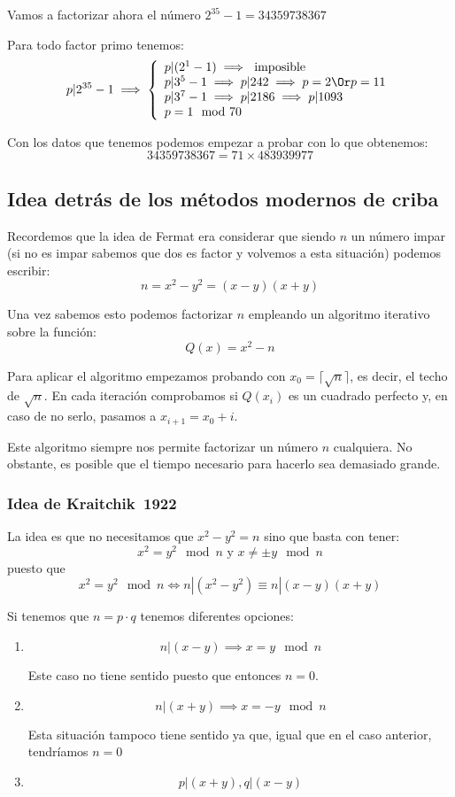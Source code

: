 \begin{example}
Vamos a factorizar ahora el número $2^{35}-1=34359738367$

Para todo factor primo tenemos:
\[p|2^{35}-1 \implies \left\{ \begin{array}{l}p|(2^1-1)\implies \text{ imposible}\\
p|3^5-1 \implies p|242 \implies p=2 \Or p=11\\
p|3^7-1 \implies p |2186 \implies  p|1093\\
p =1 \mod 70 \end{array}\right.\]

Con los datos que tenemos podemos empezar a probar con lo que obtenemos:
\[34359738367 = 71 \times 483939977\]
\end{example}

\subsection{Idea detrás de los métodos modernos de criba}

Recordemos que la idea de Fermat era considerar que siendo $n$ un número impar (si no es impar sabemos que dos es factor y volvemos a esta situación) podemos escribir:
\[n = x^2-y^2 = (x-y)(x+y)\]

Una vez sabemos esto podemos factorizar $n$ empleando un algoritmo iterativo sobre la función:
\[Q(x) = x^2 - n\]

Para aplicar el algoritmo empezamos probando con $x_0 = \lceil\sqrt{n}\rceil$, es decir, el techo de $\sqrt{n}$. En cada iteración comprobamos si $Q(x_i)$ es un cuadrado perfecto y, en caso de no serlo, pasamos a $x_{i+1}=x_0+i$.

Este algoritmo siempre nos permite factorizar un número $n$ cualquiera. No obstante, es posible que el tiempo necesario para hacerlo sea demasiado grande.

\subsubsection{Idea de Kraitchik~1922}
La idea es que no necesitamos que $x^2-y^2 =n$ sino que basta con tener:
\[x^2 = y^2 \mod n \text{ y } x \neq \pm y \mod n\]
puesto que
\[x^2 = y^2 \mod n \iff n|(x^2-y^2) \equiv n|(x-y)(x+y)\]

Si tenemos que $n=p\cdot q$ tenemos diferentes opciones:
\begin{enumerate}
\item
\[n|(x-y) \implies x=y \mod n\]

Este caso no tiene sentido puesto que entonces $n=0$.

\item
\[n|(x+y) \implies x=-y \mod n\]

Esta situación tampoco tiene sentido ya que, igual que en el caso anterior, tendríamos $n=0$

\item
\[p|(x+y), q|(x-y)\]
\end{enumerate}


